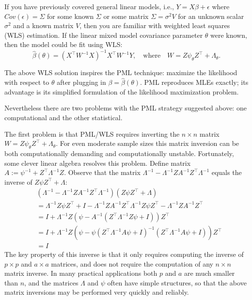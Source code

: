 \documentclass[
]{book}
\begin{document}
If you have previously covered general linear models, i.e., \(Y = X\beta + \epsilon\) where \(Cov(\epsilon) = \Sigma\) for some known \(\Sigma\) or some matrix \(\Sigma = \sigma^2 V\) for an unknown scalar \(\sigma^2\) and a known matrix \(V\), then you are familiar with weighted least squares (WLS) estimation. If the linear mixed model covariance parameter \(\theta\) were known, then the model could be fit using WLS:
\[\hat\beta(\theta) = (X^\top W^{-1}X)^{-1}X^\top W^{-1}Y, \quad \text{where} \quad W = Z \psi_\theta Z^\top + \Lambda_\theta.\]

The above WLS solution inspires the PML technique: maximize the likelihood with respect to \(\theta\) after plugging in \(\beta = \hat\beta(\theta)\). PML reproduces MLEs exactly; its advantage is its simplified formulation of the likelihood maximization problem.

Nevertheless there are two problems with the PML strategy suggested above: one computational and the other statistical.

The first problem is that PML/WLS requires inverting the \(n\times n\) matrix \(W = Z \psi_\theta Z^\top + \Lambda_\theta\). For even moderate sample sizes this matrix inversion can be both computationally demanding and computationally unstable. Fortunately, some clever linear algebra resolves this problem. Define matrix \(A:=\psi^{-1} + Z^\top \Lambda^{-1}Z\). Observe that the matrix \(\Lambda^{-1} - \Lambda^{-1}ZA^{-1}Z^\top \Lambda^{-1}\) equals the inverse of \(Z\psi Z^\top + \Lambda\):
\begin{align*}
&(\Lambda^{-1} - \Lambda^{-1}ZA^{-1}Z^\top \Lambda^{-1})(Z\psi Z^\top + \Lambda) \\
& = \Lambda^{-1}Z\psi Z^\top + I - \Lambda^{-1}ZA^{-1}Z^\top \Lambda^{-1}Z\psi Z^\top - \Lambda^{-1}ZA^{-1}Z^\top \\
& = I + \Lambda^{-1}Z(\psi - A^{-1}(Z^\top \Lambda^{-1}Z\psi + I))Z^\top \\
& = I+\Lambda^{-1}Z(\psi - \psi(Z^\top \Lambda^{-1}A\psi + I)^{-1}(Z^\top \Lambda^{-1}A\psi + I))Z^\top \\
& = I
\end{align*}
The key property of this inverse is that it only requires computing the inverse of \(p\times p\) and \(a\times a\) matrices, and does not require the computation of any \(n\times n\) matrix inverse. In many practical applications both \(p\) and \(a\) are much smaller than \(n\), and the matrices \(\Lambda\) and \(\psi\) often have simple structures, so that the above matrix inversions may be performed very quickly and reliably.
\end{document}
